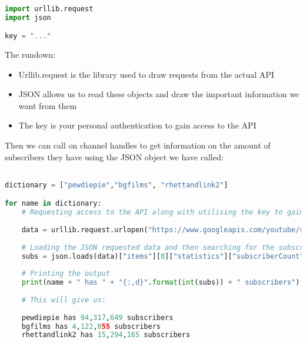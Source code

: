 \documentclass[12pt, letterpaper]{article}
\begin{document}
\begin{lstlisting}[language=python]

import urllib.request
import json

key = "..."
\end{lstlisting}

The rundown:
\begin{itemize}
	\item Urllib.request is the library used to draw requests from the actual API
	\item JSON allows us to read these objects and draw the important information we want from them
	\item The key is your personal authentication to gain access to the API
\end{itemize}

Then we can call on channel handles to get information on the amount of subscribers they have using the JSON object we have called:

\begin{lstlisting}[language=python]

dictionary = ["pewdiepie","bgfilms", "rhettandlink2"]

for name in dictionary:
	# Requesting access to the API along with utilising the key to gain access
    
    data = urllib.request.urlopen("https://www.googleapis.com/youtube/v3/channels?part=statistics&forUsername="+name+"&key="+key).read()
    
    # Loading the JSON requested data and then searching for the subscriber count
    subs = json.loads(data)["items"][0]["statistics"]["subscriberCount"]
   
    # Printing the output
    print(name + " has " + "{:,d}".format(int(subs)) + " subscribers")
    
    # This will give us:
   
    pewdiepie has 94,317,649 subscribers
	bgfilms has 4,122,055 subscribers
	rhettandlink2 has 15,294,165 subscribers
    
\end{lstlisting}
\end{document}
